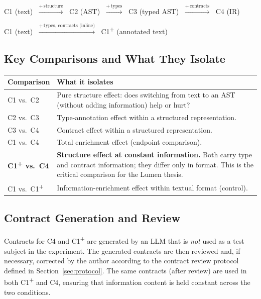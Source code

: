 \documentclass[11pt]{article}
\begin{document}
\begin{center}
  \textrm{C1 (text)}
  $\;\xrightarrow{+\,\text{structure}}\;$
  \textrm{C2 (AST)}
  $\;\xrightarrow{+\,\text{types}}\;$
  \textrm{C3 (typed AST)}
  $\;\xrightarrow{+\,\text{contracts}}\;$
  \textrm{C4 (IR)}
\end{center}

\begin{center}
  \textrm{C1 (text)}
  $\;\xrightarrow{+\,\text{types, contracts (inline)}}\;$
  \textrm{C1\textsuperscript{+} (annotated text)}
\end{center}

\subsection*{Key Comparisons and What They Isolate}

\begin{longtable}{@{}p{4cm}p{8.5cm}@{}}
  \toprule
  \textbf{Comparison} & \textbf{What it isolates} \\
  \midrule
  \endfirsthead
  C1 vs.\ C2 &
    Pure structure effect: does switching from text to an AST
    (without adding information) help or hurt? \\
  \addlinespace
  C2 vs.\ C3 &
    Type-annotation effect within a structured representation. \\
  \addlinespace
  C3 vs.\ C4 &
    Contract effect within a structured representation. \\
  \addlinespace
  C1 vs.\ C4 &
    Total enrichment effect (endpoint comparison). \\
  \addlinespace
  \textbf{C1\textsuperscript{+} vs.\ C4} &
    \textbf{Structure effect at constant information.}  Both carry
    type and contract information; they differ only in format.  This
    is the critical comparison for the Lumen thesis. \\
  \addlinespace
  C1 vs.\ C1\textsuperscript{+} &
    Information-enrichment effect within textual format (control). \\
  \bottomrule
\end{longtable}

\subsection*{Contract Generation and Review}

Contracts for C4 and C1\textsuperscript{+} are generated by an LLM
that is \emph{not} used as a test subject in the experiment.  The
generated contracts are then reviewed and, if necessary, corrected by
the author according to the contract review protocol defined in
Section~\ref{sec:protocol}.  The same contracts (after review) are
used in both C1\textsuperscript{+} and C4, ensuring that information
content is held constant across the two conditions.
\end{document}
